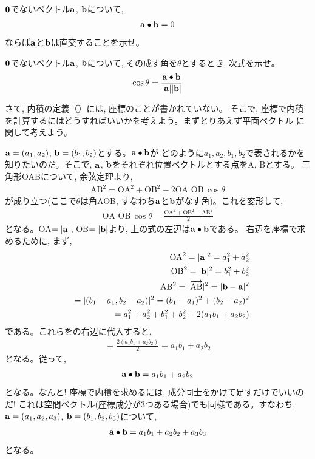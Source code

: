 \begin{q}\label{q:vect_inprod_perpendic} ${\bf 0}$でないベクトル${\bf a}$, ${\bf b}$について, 
\begin{eqnarray}
{\bf a}\bullet{\bf b}=0\label{eq_vect_inprod_rightangle}
\end{eqnarray}
ならば${\bf a}$と${\bf b}$は直交することを示せ。
\end{q}\hv

\begin{q}\label{q:vect_inprod_angle} ${\bf 0}$でないベクトル${\bf a}$, ${\bf b}$について, 
その成す角を$\theta$とするとき, 次式を示せ。
\begin{eqnarray}
\cos \theta=\frac{{\bf a}\bullet{\bf b}}{|{\bf a}||{\bf b}|}\label{eq:cos_inpro}
\end{eqnarray}\end{q}\hv

さて, 内積の定義（）には, 座標のことが書かれていない。
そこで, 座標で内積を計算するにはどうすればいいかを考えよう。まずとりあえず平面ベクトル
に関して考えよう。

${\bf a}=(a_1, a_2)$, ${\bf b}=(b_1, b_2)$とする。${\bf a}\bullet{\bf b}$が
どのように$a_1, a_2, b_1, b_2$で表されるかを知りたいのだ。そこで, 
${\bf a}$, ${\bf b}$をそれぞれ位置ベクトルとする点をA, Bとする。
三角形OABについて, 余弦定理より, 
\begin{eqnarray}
\text{AB}^2=\text{OA}^2+\text{OB}^2-2\text{OA}\,\,\text{OB}\,\cos\theta
\end{eqnarray}
が成り立つ(ここで$\theta$は角AOB, すなわち${\bf a}$と${\bf b}$がなす角)。これを変形して, 
\begin{eqnarray}
\text{OA}\,\,\text{OB}\,\cos\theta=\frac{\text{OA}^2+\text{OB}^2-\text{AB}^2}{2}\label{eq:inprod_coord06}
\end{eqnarray}
となる。OA$=|{\bf a}|$, OB$=|{\bf b}|$より, 上の式の左辺は${\bf a}\bullet{\bf b}$である。
右辺を座標で求めるために, まず, 
\begin{eqnarray}
&&\text{OA}^2=|{\bf a}|^2=a_1^2+a_2^2\\
&&\text{OB}^2=|{\bf b}|^2=b_1^2+b_2^2\\
&&\text{AB}^2=|\overrightarrow{\text{AB}}|^2=|{\bf b}-{\bf a}|^2\nonumber\\
&&=|(b_1-a_1, b_2-a_2)|^2=(b_1-a_1)^2+(b_2-a_2)^2\nonumber\\
&&=a_1^2+a_2^2+b_1^2+b_2^2-2(a_1b_1+a_2b_2)
\end{eqnarray}
である。これらをの右辺に代入すると, 
\begin{eqnarray}
=\frac{2(a_1b_1+a_2b_2)}{2}=a_1b_1+a_2b_2
\end{eqnarray}
となる。従って, 
\begin{eqnarray}
{\bf a}\bullet{\bf b}=a_1b_1+a_2b_2\label{eq:def_inprod_05}
\end{eqnarray}
となる。なんと! 座標で内積を求めるには, 成分同士をかけて足すだけでいいのだ!
これは空間ベクトル(座標成分が3つある場合)でも同様である。すなわち, 
${\bf a}=(a_1, a_2, a_3)$, ${\bf b}=(b_1, b_2, b_3)$について, 
\begin{eqnarray}
{\bf a}\bullet{\bf b}=a_1b_1+a_2b_2+a_3b_3\label{eq:def_inprod_3D}
\end{eqnarray}
となる。\hv

